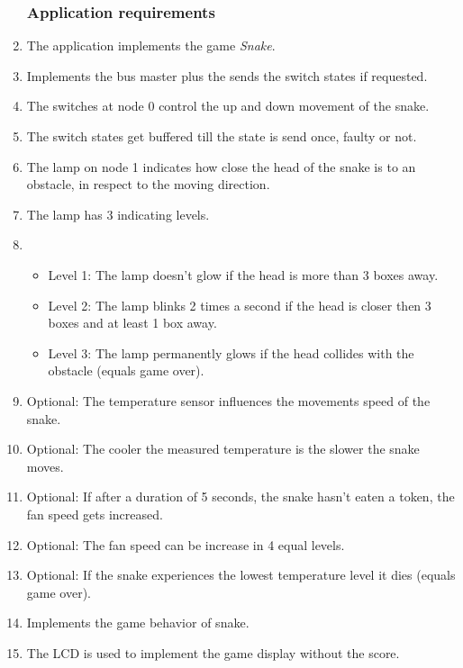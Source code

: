 \begin{enumerate}
\subsubsection{Application requirements}
\item  {} The application implements the game {\it Snake}.
\item {}  Implements the bus master plus the sends the
switch states if requested.
\item {}  The switches at node 0 control the up and down
movement of the snake.
\item {}   The switch states get buffered till
the state is send once, faulty or not. 
\item {}  The lamp on node 1 indicates how close
the head of the snake is to an obstacle, in respect to the moving direction.
\item {}  The lamp has 3 indicating levels.
\item {} 
\begin{itemize}
\item Level 1: The lamp doesn't glow if the head is more than 3 boxes away.
\item Level 2: The lamp blinks 2 times a second if the head is closer then 3 boxes and at least 1 box away.
\item Level 3: The lamp permanently glows if the head collides with the obstacle (equals game over).
\end{itemize}
\item {}  Optional: The temperature sensor influences
 the movements speed  of the snake.
\item {}  Optional: The cooler the measured temperature is the
slower the snake moves.
\item {}  Optional: If after a duration of 5 seconds, the snake
hasn't eaten a token, the fan speed gets increased.
\item {}  Optional: The fan speed can be increase in 4 equal levels.
\item {}  Optional: If the snake experiences the lowest
temperature level it dies (equals game over).
\item {}  Implements the game behavior of snake.
\item {}  The LCD is used to implement the game display without the score.

\end{enumerate}

